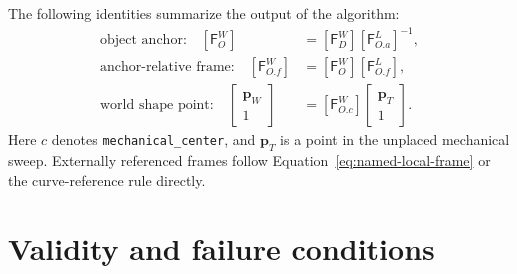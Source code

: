\documentclass[11pt,a4paper]{article}
\newcommand{\Frame}{\mathsf{F}}
\begin{document}
The following identities summarize the output of the algorithm:
\begin{align}
  \text{object anchor:}\quad
  [\Frame_O^W]&=[\Frame_D^W][\Frame_{O.a}^{L}]^{-1},\\
  \text{anchor-relative frame:}\quad
  [\Frame_{O.f}^W]&=[\Frame_O^W][\Frame_{O.f}^{L}],\\
  \text{world shape point:}\quad
  \begin{bmatrix}\mathbf{p}_W\\1\end{bmatrix}
  &=[\Frame_{O.c}^W]
    \begin{bmatrix}\mathbf{p}_T\\1\end{bmatrix}.
\end{align}
Here $c$ denotes \texttt{mechanical\_center}, and $\mathbf{p}_T$ is a point
in the unplaced mechanical sweep. Externally referenced frames follow
Equation~\eqref{eq:named-local-frame} or the curve-reference rule directly.

\section{Validity and failure conditions}
\end{document}
